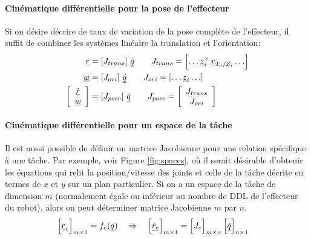 \paragraph{Cinématique différentielle pour la pose de l'effecteur}

Si on désire décrire de taux de variation de la pose complète de l'effecteur, il suffit de combiner les systèmes linéaire la translation et l'orientation:
\begin{align}
\underline{\dot{r}} &= \left[ J_{trans} \right]  \, \underline{\dot{q}} \quad \quad 
J_{trans} = \left[ \hdots \underline{z}_i^{\times} \, \underline{r}_{T_o/Z_i}  \hdots  \right] \\
\underline{w} &= \left[ J_{ori} \right]  \, \underline{\dot{q}} \quad \quad 
J_{ori}   = \left[ \hdots   \underline{z}_i  \hdots  \right] \\
\left[  \begin{array}{c}
\underline{\dot{r}} \\ \underline{w}
\end{array} \right] &= \left[ J_{pose} \right]  \, \underline{\dot{q}} \quad \quad 
J_{pose}  = \left[ \begin{array}{c}
J_{trans} \\ J_{ori} 
\end{array} \right] 
\end{align}


\paragraph{Cinématique différentielle pour un espace de la tâche}

Il est aussi possible de définir un matrice Jacobienne pour une relation spécifique à une tâche. Par exemple, voir Figure \ref{fig:spaces}, où il serait désirable d'obtenir les équations qui relit la position/vitesse des joints et celle de la tâche décrite en termes de $x$ et $y$ sur un plan particulier. Si on a un espace de la tâche de dimension $m$ (normalement égale ou inférieur au nombre de DDL de l'effecteur du robot), alors on peut déterminer matrice Jacobienne $m$ par $n$. 
\begin{align}
\Big[ \underline{r}_{e} \Big]_{m \times 1} = f_{e}( \underline{q} )
\quad \Rightarrow \quad 
\Big[ \underline{\dot{r}_{e}}\Big]_{m \times 1} &= \Big[ J_{e} \Big]_{m \times n}  \, \Big[ \underline{\dot{q}} \Big]_{n \times 1}
\end{align}


